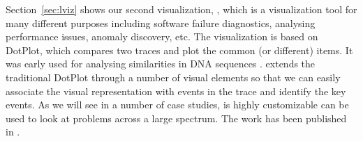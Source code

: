 Section~\ref{sec:lviz} shows our second visualization, , which
is a visualization tool for many different purposes including
software failure diagnostics,
analysing performance issues, anomaly discovery, etc.
The visualization is based on DotPlot, which compares two traces
and plot the common (or different) items.
It was early used for
analysing similarities in DNA sequences \cite{maizel1981enhanced}.
 extends the traditional DotPlot through a number of visual elements
so that we can easily associate the visual representation with events in the
trace and identify the key events.
As we will see in a number of case studies,
 is highly customizable can be used to look at problems
across a large spectrum.
The work has been published in \cite{wu2010visualizing}.
